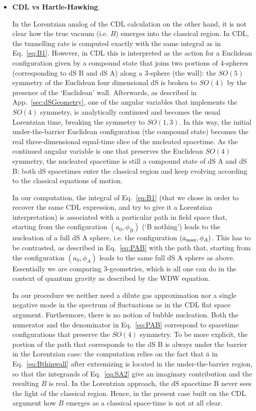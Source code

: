 \documentclass[a4paper,11pt]{article}
\numberwithin{equation}{section}
\begin{document}
\begin{itemize}
\item{\bf CDL vs Hartle-Hawking}. 

In the Lorentzian analog of the CDL calculation on the other hand,  it is not clear how the true vacuum (i.e. $B$) emerges into the classical region. In CDL, the tunnelling rate is computed exactly with the same integral as in Eq.~\eqref{eq:B1}. However, in CDL this is interpreted as the action for a Euclidean configuration given by a compound state that joins two portions of 4-spheres (corresponding to dS B and dS A) along a 3-sphere (the wall): the $SO(5)$ symmetry of the Euclidean four dimensional dS is broken to $SO(4)$ by the presence of the ‘Euclidean’ wall. Afterwards, as described in App.~\ref{sec:dSGeometry}, one of the angular variables that implements the $SO(4)$ symmetry, is analytically continued and becomes the usual Lorentzian time, breaking the symmetry to $SO(1,3)$. In this way, the initial under-the-barrier Euclidean configuration (the compound state) becomes the real three-dimensional equal-time slice of the nucleated spacetime. As the continued angular variable is one that preserves the Euclidean $SO(4)$ symmetry, the nucleated spacetime is still a compound state of dS A and dS B: both dS spacetimes enter the classical region and keep evolving according to the classical equations of motion.



In our computation, the integral of Eq.~\eqref{eq:B1} (that we chose in order to recover the same CDL expression, and try to give it a Lorentzian interpretation) is associated with a particular path in field space that, starting from the configuration $(a_0, \phi_B)$ (‘B nothing’) leads to the nucleation of a full dS A sphere, i.e. the configuration $(a_{\rm max}, \phi_A)$. This has to be contrasted, as described in Eq.~\eqref{eq:PAB} with the path that, starting from the configuration $(a_0, \phi_A)$ leads to the same full dS A sphere as above. Essentially we are comparing 3-geometries, which is all one can do in the context of quantum gravity as described by the WDW equation.



In our procedure we neither need a dilute gas approximation nor a single negative mode in the spectrum of fluctuations as in the CDL flat space argument. Furthermore, there is no notion of bubble nucleation. Both the numerator and the denominator in Eq.~\eqref{eq:PAB} correspond to spacetime configurations that preserve the $SO(4)$ symmetry. To be more explicit, the portion of the path that corresponds to the dS B is always under the barrier in the Lorentzian case: the computation relies on the fact that $\bar{a}$ in Eq.~\eqref{eq:Bthinwall} after extremizing is located in the under-the-barrier region, so that the integrands of Eq.~\eqref{eq:SA2} give an imaginary contribution and the resulting $B$ is real. In the Lorentzian approach, the dS spacetime B never sees the light of the classical region. Hence, in the present case built on the CDL argument how $B$ emerges as
a classical space-time is not at all clear. 


\end{itemize}
\end{document}
